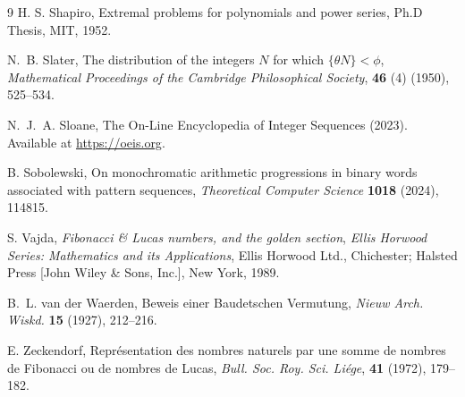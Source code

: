 \documentclass[10pt,a4paper,reqno]{amsart}
\begin{document}
\begin{thebibliography}{9}
 H. S. Shapiro, Extremal problems for polynomials and power series, Ph.D Thesis, MIT, 1952.

 N.~B. Slater, The distribution of the integers 
$N$ for which $\{\theta N\}<\phi$, {\it Mathematical Proceedings of the Cambridge Philosophical Society}, {\bf 46} (4) (1950), 525--534.

  N.~J.~A. Sloane, The On-Line Encyclopedia of Integer Sequences (2023). Available at \url{https://oeis.org}.

 B. Sobolewski, On monochromatic arithmetic progressions in binary words associated with pattern sequences, {\it Theoretical Computer Science} \textbf{1018} (2024), 114815.

 S. Vajda, {\it Fibonacci \& {L}ucas numbers, and the golden section}, {\it Ellis Horwood Series: Mathematics and its Applications}, Ellis Horwood Ltd., Chichester; Halsted Press [John Wiley \& Sons, Inc.], New York, 1989.

 B.~L. van der Waerden, Beweis einer Baudetschen Vermutung, {\it Nieuw Arch. Wiskd.} {\bf 15} (1927), 212--216.

 E. Zeckendorf, Repr\'esentation des nombres naturels par une somme de nombres de Fibonacci ou de nombres de Lucas, {\it Bull. Soc. Roy. Sci. Li\'ege}, {\bf 41} (1972), 179--182.
\end{thebibliography}
\end{document}
